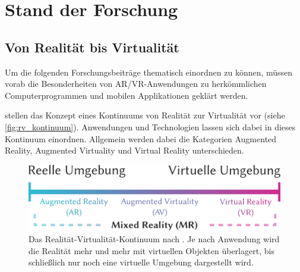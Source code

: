 \chapter{Stand der Forschung}
\label{chap:related_work}

\section{Von Realität bis Virtualität}
Um die folgenden Forschungsbeiträge thematisch einordnen zu können, müssen vorab die Besonderheiten von AR/VR-Anwendungen zu herkömmlichen Computerprogrammen und mobilen Applikationen geklärt werden.

\textcite{Milgram1994} stellen das Konzept eines Kontinuums von Realität zur Virtualität vor (siehe \autoref{fig:rv_kontinuum}).
Anwendungen und Technologien lassen sich dabei in dieses Kontinuum einordnen.
Allgemein werden dabei die Kategorien Augmented Reality, Augmented Virtuality und Virtual Reality unterschieden.
\begin{figure}[b]
    \centering
    \includegraphics[width=\linewidth]{figures/rv_kontinuum_milgram.pdf}
    \caption{Das Realität-Virtualität-Kontinuum nach \textcite{Milgram1994}. Je nach Anwendung wird die Realität mehr und mehr mit virtuellen Objekten überlagert, bis schließlich nur noch eine virtuelle Umgebung dargestellt wird.}
    \label{fig:rv_kontinuum}
\end{figure}

